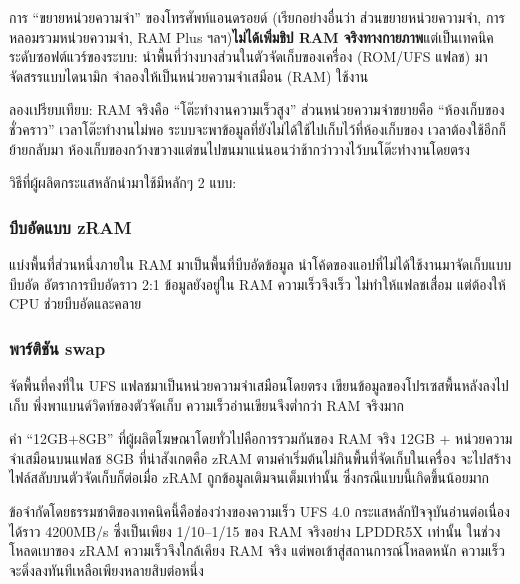 


การ “ขยายหน่วยความจำ” ของโทรศัพท์แอนดรอยด์ (เรียกอย่างอื่นว่า ส่วนขยายหน่วยความจำ, การหลอมรวมหน่วยความจำ, RAM Plus ฯลฯ)\textbf{ไม่ได้เพิ่มชิป RAM จริงทางกายภาพ}แต่เป็นเทคนิคระดับซอฟต์แวร์ของระบบ: นำพื้นที่ว่างบางส่วนในตัวจัดเก็บของเครื่อง (ROM/UFS แฟลช) มาจัดสรรแบบไดนามิก จำลองให้เป็นหน่วยความจำเสมือน (RAM) ใช้งาน

ลองเปรียบเทียบ: RAM จริงคือ “โต๊ะทำงานความเร็วสูง” ส่วนหน่วยความจำขยายคือ “ห้องเก็บของชั่วคราว” เวลาโต๊ะทำงานไม่พอ ระบบจะพาข้อมูลที่ยังไม่ได้ใช้ไปเก็บไว้ที่ห้องเก็บของ เวลาต้องใช้อีกก็ย้ายกลับมา ห้องเก็บของกว้างขวางแต่ขนไปขนมาแน่นอนว่าช้ากว่าวางไว้บนโต๊ะทำงานโดยตรง


วิธีที่ผู้ผลิตกระแสหลักนำมาใช้มีหลักๆ 2 แบบ:

\subsubsection*{บีบอัดแบบ zRAM}

แบ่งพื้นที่ส่วนหนึ่งภายใน RAM มาเป็นพื้นที่บีบอัดข้อมูล นำโค้ดของแอปที่ไม่ได้ใช้งานมาจัดเก็บแบบบีบอัด อัตราการบีบอัดราว 2:1 ข้อมูลยังอยู่ใน RAM ความเร็วจึงเร็ว ไม่ทำให้แฟลชเสื่อม แต่ต้องให้ CPU ช่วยบีบอัดและคลาย

\subsubsection*{พาร์ติชัน swap}

จัดพื้นที่คงที่ใน UFS แฟลชมาเป็นหน่วยความจำเสมือนโดยตรง เขียนข้อมูลของโปรเซสพื้นหลังลงไปเก็บ พึ่งพาแบนด์วิดท์ของตัวจัดเก็บ ความเร็วอ่านเขียนจึงต่ำกว่า RAM จริงมาก

ค่า “12GB+8GB” ที่ผู้ผลิตโฆษณาโดยทั่วไปคือการรวมกันของ RAM จริง 12GB + หน่วยความจำเสมือนบนแฟลช 8GB ที่น่าสังเกตคือ zRAM ตามค่าเริ่มต้นไม่กินพื้นที่จัดเก็บในเครื่อง จะไปสร้างไฟล์สลับบนตัวจัดเก็บก็ต่อเมื่อ zRAM ถูกข้อมูลเติมจนเต็มเท่านั้น ซึ่งกรณีแบบนี้เกิดขึ้นน้อยมาก


ข้อจำกัดโดยธรรมชาติของเทคนิคนี้คือช่องว่างของความเร็ว UFS 4.0 กระแสหลักปัจจุบันอ่านต่อเนื่องได้ราว 4200MB/s ซึ่งเป็นเพียง 1/10–1/15 ของ RAM จริงอย่าง LPDDR5X เท่านั้น ในช่วงโหลดเบาของ zRAM ความเร็วจึงใกล้เคียง RAM จริง แต่พอเข้าสู่สถานการณ์โหลดหนัก ความเร็วจะดิ่งลงทันทีเหลือเพียงหลายสิบต่อหนึ่ง

